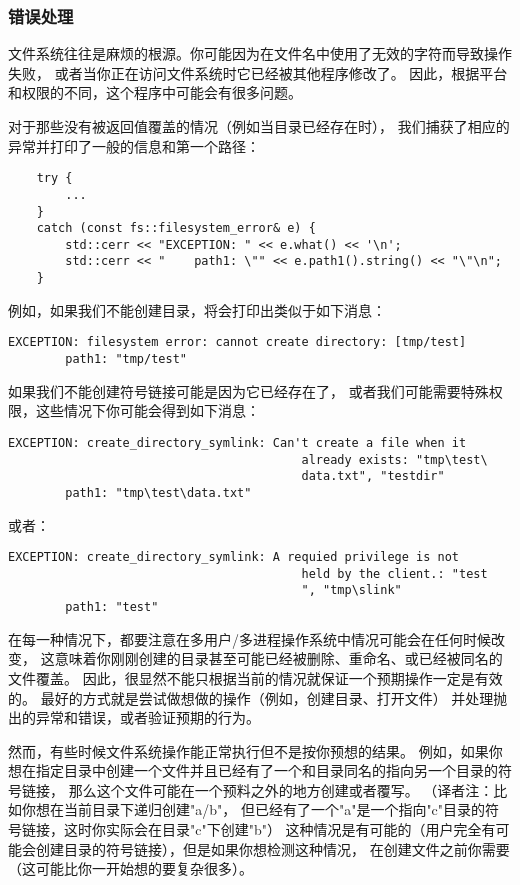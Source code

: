 \subsubsection{错误处理}\label{ch20.1.3.6}
文件系统往往是麻烦的根源。你可能因为在文件名中使用了无效的字符而导致操作失败，
或者当你正在访问文件系统时它已经被其他程序修改了。
因此，根据平台和权限的不同，这个程序中可能会有很多问题。

对于那些没有被返回值覆盖的情况（例如当目录已经存在时），
我们捕获了相应的异常并打印了一般的信息和第一个路径：
\begin{lstlisting}
    try {
        ...
    }
    catch (const fs::filesystem_error& e) {
        std::cerr << "EXCEPTION: " << e.what() << '\n';
        std::cerr << "    path1: \"" << e.path1().string() << "\"\n";
    }
\end{lstlisting}
例如，如果我们不能创建目录，将会打印出类似于如下消息：
\begin{lstlisting}[stringstyle=\color{black}]
    EXCEPTION: filesystem error: cannot create directory: [tmp/test]
        path1: "tmp/test"
\end{lstlisting}
如果我们不能创建符号链接可能是因为它已经存在了，
或者我们可能需要特殊权限，这些情况下你可能会得到如下消息：\label{创建链接失败}
\begin{lstlisting}[stringstyle=\color{black}]
    EXCEPTION: create_directory_symlink: Can't create a file when it
                                         already exists: "tmp\test\
                                         data.txt", "testdir"
        path1: "tmp\test\data.txt"
\end{lstlisting}
或者：
\begin{lstlisting}[stringstyle=\color{black}, keywordstyle=\color{black}]
    EXCEPTION: create_directory_symlink: A requied privilege is not
                                         held by the client.: "test
                                         ", "tmp\slink"
        path1: "test"
\end{lstlisting}
在每一种情况下，都要注意在多用户/多进程操作系统中情况可能会在任何时候改变，
这意味着你刚刚创建的目录甚至可能已经被删除、重命名、或已经被同名的文件覆盖。
因此，很显然不能只根据当前的情况就保证一个预期操作一定是有效的。
最好的方式就是尝试做想做的操作（例如，创建目录、打开文件）
并处理抛出的异常和错误，或者验证预期的行为。

然而，有些时候文件系统操作能正常执行但不是按你预想的结果。
例如，如果你想在指定目录中创建一个文件并且已经有了一个和目录同名的指向另一个目录的符号链接，
那么这个文件可能在一个预料之外的地方创建或者覆写。
（译者注：比如你想在当前目录下递归创建"a/b"，
但已经有了一个"a"是一个指向"c"目录的符号链接，这时你实际会在目录"c"下创建"b"）
这种情况是有可能的（用户完全有可能会创建目录的符号链接），但是如果你想检测这种情况，
在创建文件之前你需要（这可能比你一开始想的要复杂很多）。

